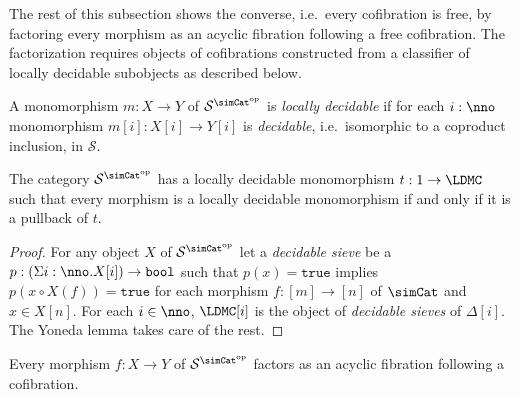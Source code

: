 \documentclass{tac}
\newcommand\cat\mathcal
\newcommand\dual{^{\mathrm{op}}}
\newcommand\s{^{\simCat\dual}}
\newcommand\of{:}
\newcommand\simplex\Delta
\newcommand\true{\mathtt{true}}
\newcommand\bool{\mathtt{bool}}
\begin{document}
The rest of this subsection shows the converse, i.e.\ every cofibration is free, by factoring every morphism as an acyclic fibration following a free cofibration. The factorization requires objects of cofibrations constructed from a classifier of locally decidable subobjects as described below.

\begin{definition} A monomorphism $m\of X\to Y$ of $\cat S\s$ is \emph{locally decidable} if for each $i\of\nno$ monomorphism $m[i]\of X[i]\to Y[i]$ is \emph{decidable}, i.e.\ isomorphic to a coproduct inclusion, in $\cat S$. \end{definition}


\begin{lemma} The category $\cat S\s$ has a locally decidable monomorphism $t\of 1\to \LDMC$ such that every morphism is a locally decidable monomorphism if and only if it is a pullback of $t$. \end{lemma}

\begin{proof} For any object $X$ of $\cat S\s$ let a \emph{decidable sieve} be a $p\of(\Sigma i\of\nno.X[i])\to\bool$ such that $p(x)=\true$ implies $p(x\circ X(f))=\true$ for each morphism $f\of [m]\to [n]$ of $\simCat$ and $x\in X[n]$. For each $i\in\nno$, $\LDMC[i]$ is the object of \emph{decidable sieves} of $\simplex[i]$. The Yoneda lemma takes care of the rest. \end{proof}

\begin{proposition} Every morphism $f\of X\to Y$ of $\cat S\s$ factors as an acyclic fibration following a cofibration. \label{factor1} \end{proposition}
\end{document}
